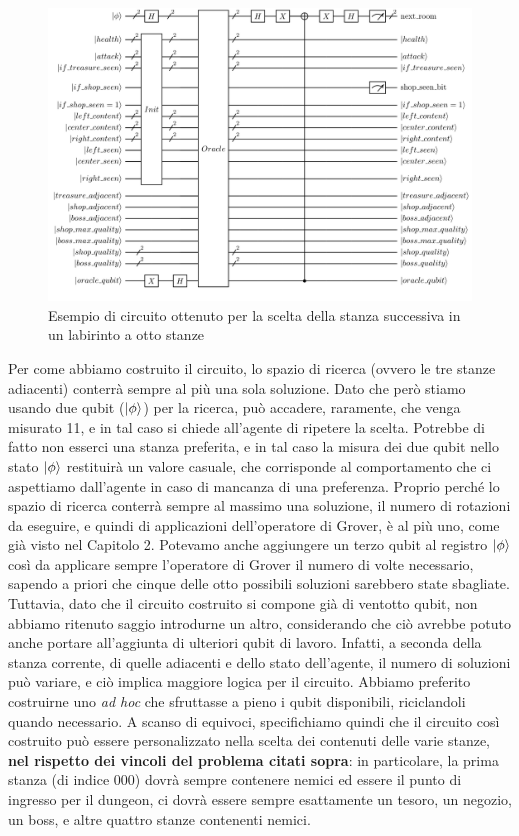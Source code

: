 \documentclass{book}
\theoremstyle{definition}
\theoremstyle{definition}
\theoremstyle{definition}
\theoremstyle{plain}
\theoremstyle{plain}
\theoremstyle{plain}
\theoremstyle{plain}
\begin{document}
\newpage

\begin{figure}[H]
\captionsetup{font=scriptsize}
\begin{center}
    \includegraphics[width=1\textwidth]{Immagini troppo complicate/circuito_8_stanze_2.png}
\end{center}
\caption{\scriptsize Esempio di circuito ottenuto per la scelta della stanza successiva in un labirinto a otto stanze}\label{fig:circ_2^3}
\end{figure}
\noindent Per come abbiamo costruito il circuito, lo spazio di ricerca (ovvero le tre stanze adiacenti) conterrà sempre al più una sola soluzione. Dato che però stiamo usando due qubit ($\ket{\phi}$) per la ricerca, può accadere, raramente, che venga misurato 11, e in tal caso si chiede all'agente di ripetere la scelta. Potrebbe di fatto non esserci una stanza preferita, e in tal caso la misura dei due qubit nello stato $\ket{\phi}$ restituirà un valore casuale, che corrisponde al comportamento che ci aspettiamo dall'agente in caso di mancanza di una preferenza. Proprio perché lo spazio di ricerca conterrà sempre al massimo una soluzione, il numero di rotazioni da eseguire, e quindi di applicazioni dell'operatore di Grover, è al più uno, come già visto nel Capitolo 2. Potevamo anche aggiungere un terzo qubit al registro $\ket{\phi}$ così da applicare sempre l'operatore di Grover il numero di volte necessario, sapendo a priori che cinque delle otto possibili soluzioni sarebbero state sbagliate. Tuttavia, dato che il circuito costruito si compone già di ventotto qubit, non abbiamo ritenuto saggio introdurne un altro, considerando che ciò avrebbe potuto anche portare all'aggiunta di ulteriori qubit di lavoro. Infatti, a seconda della stanza corrente, di quelle adiacenti e dello stato dell'agente, il numero di soluzioni può variare, e ciò implica maggiore logica per il circuito. Abbiamo preferito costruirne uno \textit{ad hoc} che sfruttasse a pieno i qubit disponibili, riciclandoli quando necessario. A scanso di equivoci, specifichiamo quindi che il circuito così costruito può essere personalizzato nella scelta dei contenuti delle varie stanze, \textbf{nel rispetto dei vincoli del problema citati sopra}: in particolare, la prima stanza (di indice 000) dovrà sempre contenere nemici ed essere il punto di ingresso per il dungeon, ci dovrà essere sempre esattamente un tesoro, un negozio, un boss, e altre quattro stanze contenenti nemici.
\end{document}
